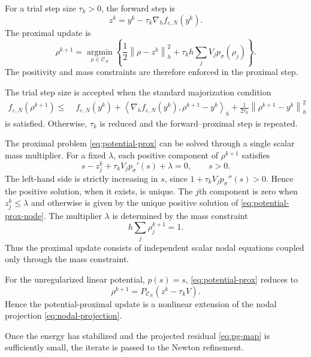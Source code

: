 \documentclass[11pt]{article}
\newcommand{\CN}{\mathcal{C}_N}
\newcommand{\eps}{\varepsilon}
\newcommand{\sig}{\sigma}
\newcommand{\inner}[2]{\left\langle #1,#2\right\rangle}
\newcommand{\norm}[1]{\left\|#1\right\|}
\theoremstyle{plain}
\theoremstyle{definition}
\numberwithin{equation}{section}
\begin{document}
For a trial step size $\tau_k>0$, the forward step is
\begin{equation}
\label{eq:fista-forward}
z^k
=
y^k-\tau_k\nabla_h f_{\eps,N}(y^k).
\end{equation}
The proximal update is
\begin{equation}
\label{eq:potential-prox}
\rho^{k+1}
=
\operatorname*{argmin}_{\rho\in\CN}
\left\{
\frac12\norm{\rho-z^k}_h^2
+
\tau_k h\sum_jV_jp_\sig(\rho_j)
\right\}.
\end{equation}
The positivity and mass constraints are therefore enforced in the
proximal step.

The trial step size is accepted when the standard majorization
condition
\begin{equation}
\label{eq:fista-backtracking}
\begin{aligned}
f_{\eps,N}(\rho^{k+1})
\le\;&
f_{\eps,N}(y^k)
+
\inner{\nabla_h f_{\eps,N}(y^k)}
       {\rho^{k+1}-y^k}_h 
+
\frac{1}{2\tau_k}
\norm{\rho^{k+1}-y^k}_h^2
\end{aligned}
\end{equation}
is satisfied. Otherwise, $\tau_k$ is reduced and the
forward--proximal step is repeated.

The proximal problem \eqref{eq:potential-prox} can be solved through
a single scalar mass multiplier. For a fixed $\lambda$, each positive
component of $\rho^{k+1}$ satisfies
\begin{equation}
\label{eq:potential-prox-node}
s-z_j^k
+\tau_kV_jp_\sig'(s)
+\lambda
=
0,
\qquad s>0.
\end{equation}
The left-hand side is strictly increasing in $s$, since
\(
1+\tau_kV_jp_\sig''(s)>0.
\)
Hence the positive solution, when it exists, is unique. The $j$th
component is zero when $z_j^k\le\lambda$ and otherwise is given by
the unique positive solution of
\eqref{eq:potential-prox-node}. The multiplier $\lambda$ is determined
by the mass constraint
\[
h\sum_j\rho_j^{k+1}=1.
\]
Thus the proximal update consists of independent scalar nodal
equations coupled only through the mass constraint.

For the unregularized linear potential, $p(s)=s$,
\eqref{eq:potential-prox} reduces to
\[
\rho^{k+1}
=
P_{\CN}(z^k-\tau_kV).
\]
Hence the potential-proximal update is a nonlinear extension of the
nodal projection \eqref{eq:nodal-projection}.

Once the energy has stabilized and the projected residual \eqref{eq:pg-map} is
sufficiently small, the iterate is passed to the Newton refinement.
\end{document}
